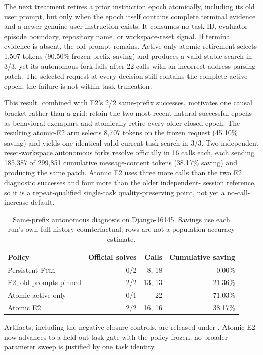 \documentclass[11pt]{article}
\begin{document}
The next treatment retires a prior instruction epoch atomically, including its
old user prompt, but only when the epoch itself contains complete terminal
evidence and a newer genuine user instruction exists.  It consumes no task ID,
evaluator episode boundary, repository name, or workspace-reset signal.  If
terminal evidence is absent, the old prompt remains.  Active-only atomic
retirement selects 1,507 tokens (90.50\% frozen-prefix saving) and produces a
valid stable search in 3/3, yet its autonomous fork fails after 22 calls with
an incorrect address-parsing patch.  The selected request at every decision
still contains the complete active epoch; the failure is not within-task
truncation.

This result, combined with E2's 2/2 same-prefix successes, motivates one causal
bracket rather than a grid: retain the two most recent natural successful
epochs as behavioral exemplars and atomically retire every older closed epoch.
The resulting atomic-E2 arm selects 8,707 tokens on the frozen request
(45.10\% saving) and yields one identical valid current-task search in 3/3.
Two independent reset-workspace autonomous forks resolve officially in 16
calls each, each sending 185,387 of 299,851 cumulative message-content tokens
(38.17\% saving) and producing the same patch.  Atomic E2 uses three more calls
than the two E2 diagnostic successes and four more than the older independent-
session reference, so it is a repeat-qualified single-task quality-preserving
point, not yet a no-call-increase default.

\begin{table}[H]
\centering
\small
\caption{Same-prefix autonomous diagnosis on Django-16145.  Savings use each
run's own full-history counterfactual; rows are not a population accuracy
estimate.}
\label{tab:atomic-epoch-bracket}
\begin{tabular}{lrrr}
\toprule
Policy & Official solves & Calls & Cumulative saving \\
\midrule
Persistent \textsc{Full} & 0/2 & 8, 18 & 0.00\% \\
E2, old prompts pinned & 2/2 & 13, 13 & 21.36\% \\
Atomic active-only & 0/1 & 22 & 71.03\% \\
Atomic E2 & 2/2 & 16, 16 & 38.17\% \\
\bottomrule
\end{tabular}
\end{table}

Artifacts, including the negative closure controls, are released under
.  Atomic E2 now advances to a
held-out-task gate with the policy frozen; no broader parameter sweep is
justified by one task identity.
\end{document}
